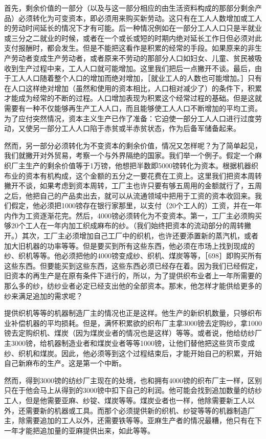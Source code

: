 首先，剩余价值的一部分（以及与这一部分相应的由生活资料构成的那部分剩余产品）必须转化为可变资本，即必须用来购买新劳动。这只有在工人人数增加或工人的劳动时间延长的情况下才有可能。后一种情况例如在一部分工人人口只是半就业或三分之二就业的时候，或者在一个或长或短的时期内绝对延长工作日但必须对此支付报酬时，都会发生。但是不能把这看作是积累的经常的手段。如果原来的非生产劳动者变成生产劳动者，或者原来不劳动的那部分人口如妇女、儿童、贫民被吸收到生产过程中来，工人人口就可能增加。这里我们把后一点撇开不谈。最后，由于工人人口随着整个人口的增加而绝对增加，［就业工人的人数也可能增加。］只有在人口这样绝对增加（虽然和使用的资本相比，人口相对减少了）的条件下，积累才能成为经常的不断的过程。人口增加表现为积累这个经常过程的基础。但是这就需要有一种不仅能够再生产工人人口，而且能够使工人人口不断增加的平均工资。为了应付突然情况，资本主义生产已作了准备：它迫使一部分工人人口进行过度劳动，又使另一部分工人人口陷于赤贫或半赤贫状态，作为后备军储备起来。

然而，另一部分必须转化为不变资本的剩余价值，情况又怎样呢？为了简单起见，我们就撇开对外贸易，考察一个与外界隔绝的国家。我们举一个例子。假定一个麻织厂主生产的剩余价值等于1万镑，他想把半数即5000镑转化为资本。根据机器织布业的资本有机构成，这个金额的五分之一要花费在工资上。这里我们把资本周转撇开不谈，如果考虑到资本周转，工厂主也许只要有够五周用的金额就行了，五周之后，他把自己的产品卖出去，就可以从流通领域中把用于工资的资本收回来。我们假定，他必须把1000镑存在银行家那里，以支付（20个工人的）工资，并在一年内作为工资逐渐花完。然后，4000镑必须转化为不变资本。第一，工厂主必须购买够20个工人在一年内加工织成麻布的纱。（我们始终把资本的流动部分的周转撇开。）其次，工厂主必须增加自己工厂中的织机，也许还要添置新的蒸汽机，或者加大旧机器的功率等等。但是要买到所有这些东西，他必须在市场上找到现成的纱、织机等等。他必须把他的4000镑变成纱、织机、煤炭等等，［698］即购买所有这些东西。但要能买到这些东西，这些东西必须已经存在着。因为我们已经假定，旧资本的再生产是在原有条件下进行的，所以，为了提供织布业者上一年所需要的那么多的纱，纺纱业者必定已经支出他的全部资本。那末，他怎样才能供给更多的纱来满足追加的需求呢？

提供织机等等的机器制造厂主的情况也正是这样。他生产的新织机数量，只够织布业补偿机器的平均损耗。但是，满怀积累欲的织布厂主拿3000镑去定购纱，拿1000镑去定购织机、煤炭（因为煤炭业者的情况也是这样）等等。或者说，他给纺纱厂主3000镑，给机器制造业者和煤炭业者等等1000镑，让他们替他把这些货币变成纱、织机和煤炭。因此，他必须等到这个过程结束后，才能开始自己的积累，开始自己新麻布的生产。这是第一个中断。

然而，得到3000镑的纺纱厂主现在的处境，也和拥有4000镑的织布厂主一样，区别只在于他会马上从得到的3000镑中扣下自己的利润。他可能会找到追加数量的纺纱工人，但是他需要亚麻、纱锭、煤炭等等。煤炭业者也一样，他除需要新工人以外，还需要新的机器或工具。而那个必须提供新的织机、纱锭等等的机器制造厂主，除需要追加的工人以外，还需要铁等等。亚麻生产者的情况最糟，他只有在下一年才能把追加量的亚麻提供出来，如此等等。

